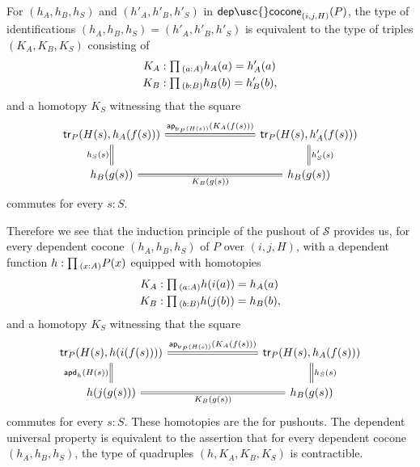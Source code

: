 \begin{rmk}\label{rmk:comp-pushout}
  For $(h_A,h_B,h_S)$ and $(h'_A,h'_B,h'_S)$ in $\mathsf{dep\usc{}cocone}_{(i,j,H)}(P)$, the type of identifications $(h_A,h_B,h_S)=(h'_A,h'_B,h'_S)$ is equivalent to the type of triples $(K_A,K_B,K_S)$ consisting of
  \begin{align*}
    K_A & : \prd{a:A}h_A(a)=h'_A(a) \\
    K_B & : \prd{b:B}h_B(b)=h'_B(b),
  \end{align*}
  and a homotopy $K_S$ witnessing that the square
  \begin{equation*}
    \begin{tikzcd}[column sep=8em]
      \mathsf{tr}_P(H(s),h_A(f(s))) \arrow[r,equals,"\ap{\mathsf{tr}_P(H(s))}{K_A(f(s))}"] \arrow[d,equals,swap,"h_S(s)"] & \mathsf{tr}_P(H(s),{h'_A(f(s))}) \arrow[d,equals,"h'_S(s)"] \\
      h_B(g(s)) \arrow[r,equals,swap,"K_B(g(s))"] & h_B(g(s))
    \end{tikzcd}
  \end{equation*}
  commutes for every $s:S$.

  Therefore we see that the induction principle of the pushout of $\mathcal{S}$ provides us, for every dependent cocone $(h_A,h_B,h_S)$ of $P$ over $(i,j,H)$, with a dependent function $h:\prd{x:A}P(x)$ equipped with homotopies
  \begin{align*}
    K_A & : \prd{a:A}h(i(a))=h_A(a) \\
    K_B & : \prd{b:B}h(j(b))=h_B(b),
  \end{align*}
  and a homotopy $K_S$ witnessing that the square
  \begin{equation*}
    \begin{tikzcd}[column sep=8em]
      \mathsf{tr}_P(H(s),h(i(f(s)))) \arrow[r,equals,"\ap{\mathsf{tr}_P(H(s))}{K_A(f(s))}"] \arrow[d,equals,swap,"\apd{h}{H(s)}"] & \mathsf{tr}_P(H(s),{h_A(f(s))}) \arrow[d,equals,"h_S(s)"] \\
      h(j(g(s))) \arrow[r,equals,swap,"K_B(g(s))"] & h_B(g(s))
    \end{tikzcd}
  \end{equation*}
  commutes for every $s:S$. These homotopies are the  for pushouts. The dependent universal property is equivalent to the assertion that for every dependent cocone $(h_A,h_B,h_S)$, the type of quadruples $(h,K_A,K_B,K_S)$ is contractible.
\end{rmk}

